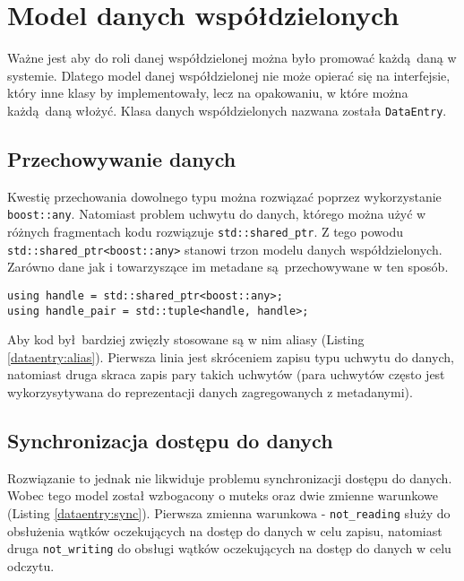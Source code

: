 \section{Model danych współdzielonych}
Ważne jest aby do roli danej współdzielonej można było promować każdą daną w systemie. Dlatego model danej współdzielonej nie może opierać się na interfejsie, który inne klasy by implementowały, lecz na opakowaniu, w które można każdą daną włożyć. Klasa danych współdzielonych nazwana została \lstinline$DataEntry$.


\subsection{Przechowywanie danych}
Kwestię przechowania dowolnego typu można rozwiązać poprzez wykorzystanie \lstinline$boost::any$. Natomiast problem uchwytu do danych, którego można użyć w różnych fragmentach kodu rozwiązuje \lstinline$std::shared_ptr$. Z tego powodu \lstinline$std::shared_ptr<boost::any>$ stanowi trzon modelu danych współdzielonych. Zarówno dane jak i towarzyszące im metadane są przechowywane w ten sposób. 
 
\begin{minipage}{\textwidth}
	\begin{lstlisting}[label=dataentry:alias, caption={Aliasy używane w kodzie aplikacji},alsoletter={()[].=}]
using handle = std::shared_ptr<boost::any>;
using handle_pair = std::tuple<handle, handle>;
	\end{lstlisting}
\end{minipage}

Aby kod był bardziej zwięzły stosowane są w nim aliasy (Listing \ref{dataentry:alias}). Pierwsza linia jest skróceniem zapisu typu uchwytu do danych, natomiast druga skraca zapis pary takich uchwytów (para uchwytów często jest wykorzysytywana do reprezentacji danych zagregowanych z metadanymi).

\subsection{Synchronizacja dostępu do danych}
Rozwiązanie to jednak nie likwiduje problemu synchronizacji dostępu do danych. Wobec tego model został wzbogacony o muteks oraz dwie zmienne warunkowe (Listing \ref{dataentry:sync}). Pierwsza zmienna warunkowa - \lstinline$not_reading$ służy do obsłużenia wątków oczekujących na dostęp do danych w celu zapisu, natomiast druga \lstinline$not_writing$ do obsługi wątków oczekujących na dostęp do danych w celu odczytu.

